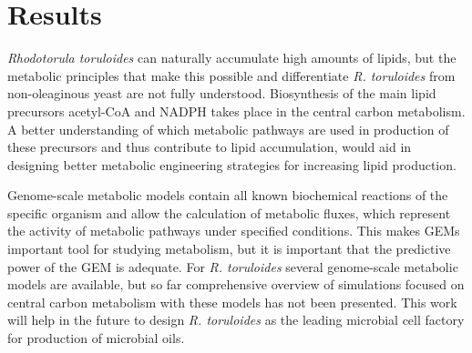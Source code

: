 \chapter{Results}





\textit{Rhodotorula toruloides} can naturally accumulate high amounts of lipids, but the 
metabolic principles that make this possible and differentiate \textit{R. toruloides} from non-oleaginous yeast are not fully understood.
Biosynthesis of the main lipid precursors acetyl-CoA and NADPH takes place in the central carbon metabolism. A better understanding of which 
metabolic pathways are used in production of these precursors and thus contribute to lipid accumulation, would aid in designing better 
metabolic engineering strategies for increasing lipid production.

Genome-scale metabolic models contain all known biochemical reactions of the specific organism and allow the calculation of
metabolic fluxes, which represent the activity of metabolic pathways under specified conditions. 
This makes GEMs important tool for studying metabolism, but it is important that the predictive power of the GEM is
adequate. For \textit{R. toruloides} several genome-scale metabolic models are available, but so far comprehensive overview of 
simulations focused on central carbon metabolism with these models has not been presented.
This work will help in the future to design \textit{R. toruloides} as the leading microbial cell factory for production of microbial oils.









